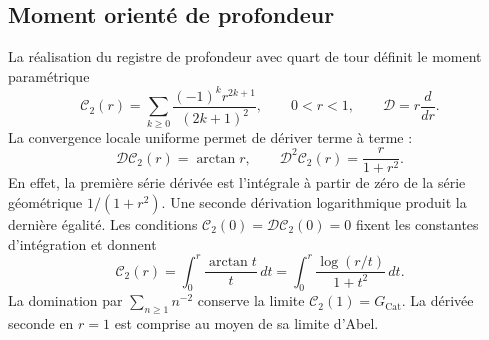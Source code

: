 \subsection{Moment orienté de profondeur}
\label{corpus9:iv:pell-momento}

La réalisation du registre de profondeur avec quart de tour
définit le moment paramétrique
\[
 \mathcal C_2(r)=
   \sum_{k\geq0}\frac{(-1)^kr^{2k+1}}{(2k+1)^2},
 \qquad 0<r<1,\qquad
 \mathcal D=r\frac{d}{dr}.
\]
La convergence locale uniforme permet de dériver terme à terme :
\[
 \mathcal D\mathcal C_2(r)=\arctan r,\qquad
 \mathcal D^2\mathcal C_2(r)=\frac{r}{1+r^2}.
\]
En effet, la première série dérivée est l’intégrale à partir de zéro
de la série géométrique \(1/(1+r^2)\). Une seconde dérivation
logarithmique produit la dernière égalité. Les conditions
\(\mathcal C_2(0)=\mathcal D\mathcal C_2(0)=0\) fixent les
constantes d’intégration et donnent
\[
 \mathcal C_2(r)=\int_0^r\frac{\arctan t}{t}\,dt
   =\int_0^r\frac{\log(r/t)}{1+t^2}\,dt.
\]
La domination par \(\sum_{n\geq1}n^{-2}\) conserve la limite
\(\mathcal C_2(1)=G_{\mathrm{Cat}}\). La dérivée seconde
en \(r=1\) est comprise au moyen de sa limite d’Abel.
